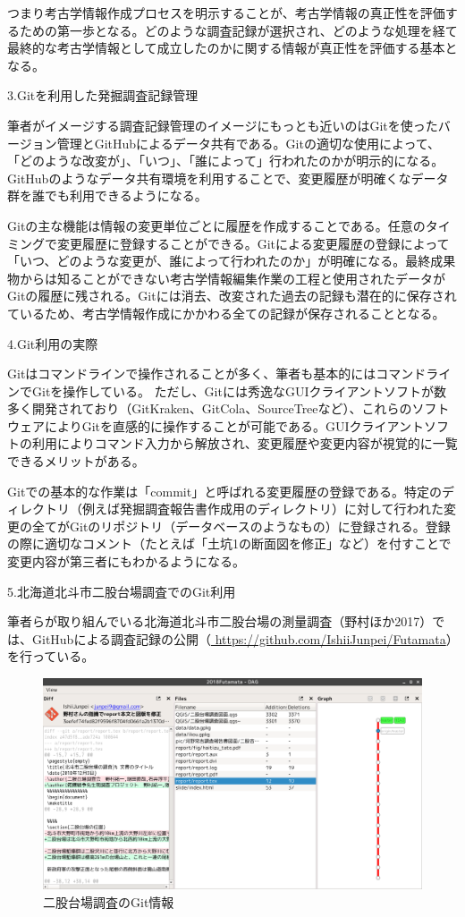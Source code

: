 \documentclass[9pt,b5j,papersize]{jsarticle}
\begin{document}
\begin{multicols}{2}
つまり考古学情報作成プロセスを明示することが、考古学情報の真正性を評価するための第一歩となる。どのような調査記録が選択され、どのような処理を経て最終的な考古学情報として成立したのかに関する情報が真正性を評価する基本となる。

\noindent
{\large 3.Gitを利用した発掘調査記録管理}

筆者がイメージする調査記録管理のイメージにもっとも近いのはGitを使ったバージョン管理とGitHubによるデータ共有である。Gitの適切な使用によって、「どのような改変が」、「いつ」、「誰によって」行われたのかが明示的になる。GitHubのようなデータ共有環境を利用することで、変更履歴が明確くなデータ群を誰でも利用できるようになる。

Gitの主な機能は情報の変更単位ごとに履歴を作成することである。任意のタイミングで変更履歴に登録することができる。Gitによる変更履歴の登録によって「いつ、どのような変更が、誰によって行われたのか」が明確になる。最終成果物からは知ることができない考古学情報編集作業の工程と使用されたデータがGitの履歴に残される。Gitには消去、改変された過去の記録も潜在的に保存されているため、考古学情報作成にかかわる全ての記録が保存されることとなる。

\noindent
{\large 4.Git利用の実際}

Gitはコマンドラインで操作されることが多く、筆者も基本的にはコマンドラインでGitを操作している。
ただし、Gitには秀逸なGUIクライアントソフトが数多く開発されており（GitKraken、GitCola、SourceTreeなど）、これらのソフトウェアによりGitを直感的に操作することが可能である。GUIクライアントソフトの利用によりコマンド入力から解放され、変更履歴や変更内容が視覚的に一覧できるメリットがある。

Gitでの基本的な作業は「commit」と呼ばれる変更履歴の登録である。特定のディレクトリ（例えば発掘調査報告書作成用のディレクトリ）に対して行われた変更の全てがGitのリポジトリ（データベースのようなもの）に登録される。登録の際に適切なコメント（たとえば「土坑1の断面図を修正」など）を付すことで変更内容が第三者にもわかるようになる。

\noindent
{\large 5.北海道北斗市二股台場調査でのGit利用}

筆者らが取り組んでいる北海道北斗市二股台場の測量調査（野村ほか2017）では、GitHubによる調査記録の公開（\url{ https://github.com/IshiiJunpei/Futamata}）を行っている。

\begin{figure}[H]
\centering
\includegraphics[width=1\columnwidth]{01.png}
\caption{二股台場調査のGit情報}
\label{hutamata}
\end{figure}


\end{multicols}
\end{document}
